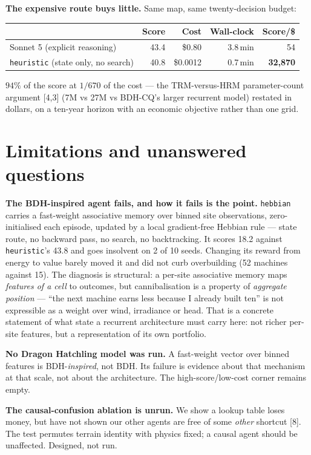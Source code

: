 \documentclass[9pt]{extarticle}
\begin{document}
\textbf{The expensive route buys little.} Same map, same twenty-decision budget:

\begin{center}\small
\begin{tabular}{lrrrr}
\toprule
& Score & Cost & Wall-clock & Score/\$ \\
\midrule
Sonnet 5 (explicit reasoning) & 43.4 & \$0.80 & 3.8\,min & 54 \\
\texttt{heuristic} (state only, no search) & 40.8 & \$0.0012 & 0.7\,min & \textbf{32{,}870} \\
\bottomrule
\end{tabular}
\end{center}

$94\%$ of the score at $1/670$ of the cost --- the TRM-versus-HRM parameter-count
argument [4,3] (7M vs 27M vs BDH-CQ's larger recurrent model) restated in
dollars, on a ten-year horizon with an economic objective rather than one grid.

\section{Limitations and unanswered questions}

\textbf{The BDH-inspired agent fails, and how it fails is the point.}
\texttt{hebbian} carries a fast-weight associative memory over binned site
observations, zero-initialised each episode, updated by a local gradient-free
Hebbian rule --- state route, no backward pass, no search, no backtracking. It
scores 18.2 against \texttt{heuristic}'s 43.8 and goes insolvent on 2 of 10
seeds. Changing its reward from energy to value barely moved it and did not curb
overbuilding (52 machines against 15). The diagnosis is structural: a per-site
associative memory maps \emph{features of a cell} to outcomes, but
cannibalisation is a property of \emph{aggregate position} --- ``the next machine
earns less because I already built ten'' is not expressible as a weight over
wind, irradiance or head. That is a concrete statement of what state a recurrent
architecture must carry here: not richer per-site features, but a representation
of its own portfolio.

\textbf{No Dragon Hatchling model was run.} A fast-weight vector over binned
features is BDH-\emph{inspired}, not BDH. Its failure is evidence about that
mechanism at that scale, not about the architecture. The high-score/low-cost
corner remains empty.

\textbf{The causal-confusion ablation is unrun.} We show a lookup table loses
money, but have not shown our other agents are free of some \emph{other} shortcut
[8]. The test permutes terrain identity with physics fixed; a causal agent should
be unaffected. Designed, not run.
\end{document}
